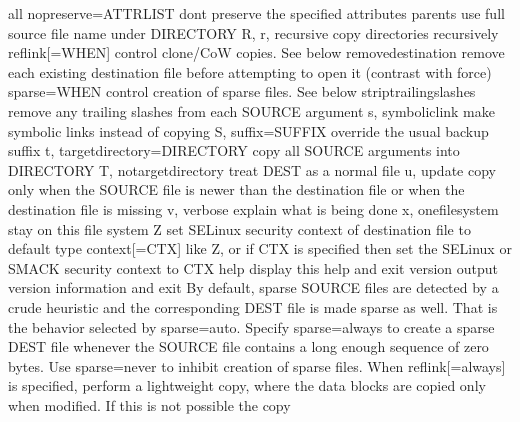\documentclass[letterpaper,12pt,english]{sphinxmanual}
\begin{document}
\begin{sphinxVerbatim}[commandchars=\\\{\}]
                                 all
      \PYGZhy{}\PYGZhy{}no\PYGZhy{}preserve=ATTR\PYGZus{}LIST  don\PYGZsq{}t preserve the specified attributes
      \PYGZhy{}\PYGZhy{}parents                use full source file name under DIRECTORY
  \PYGZhy{}R, \PYGZhy{}r, \PYGZhy{}\PYGZhy{}recursive          copy directories recursively
      \PYGZhy{}\PYGZhy{}reflink[=WHEN]         control clone/CoW copies. See below
      \PYGZhy{}\PYGZhy{}remove\PYGZhy{}destination     remove each existing destination file before
                                 attempting to open it (contrast with \PYGZhy{}\PYGZhy{}force)
      \PYGZhy{}\PYGZhy{}sparse=WHEN            control creation of sparse files. See below
      \PYGZhy{}\PYGZhy{}strip\PYGZhy{}trailing\PYGZhy{}slashes  remove any trailing slashes from each SOURCE
                                 argument
  \PYGZhy{}s, \PYGZhy{}\PYGZhy{}symbolic\PYGZhy{}link          make symbolic links instead of copying
  \PYGZhy{}S, \PYGZhy{}\PYGZhy{}suffix=SUFFIX          override the usual backup suffix
  \PYGZhy{}t, \PYGZhy{}\PYGZhy{}target\PYGZhy{}directory=DIRECTORY  copy all SOURCE arguments into DIRECTORY
  \PYGZhy{}T, \PYGZhy{}\PYGZhy{}no\PYGZhy{}target\PYGZhy{}directory    treat DEST as a normal file
  \PYGZhy{}u, \PYGZhy{}\PYGZhy{}update                 copy only when the SOURCE file is newer
                                 than the destination file or when the
                                 destination file is missing
  \PYGZhy{}v, \PYGZhy{}\PYGZhy{}verbose                explain what is being done
  \PYGZhy{}x, \PYGZhy{}\PYGZhy{}one\PYGZhy{}file\PYGZhy{}system        stay on this file system
  \PYGZhy{}Z                           set SELinux security context of destination
                                 file to default type
      \PYGZhy{}\PYGZhy{}context[=CTX]          like \PYGZhy{}Z, or if CTX is specified then set the
                                 SELinux or SMACK security context to CTX
      \PYGZhy{}\PYGZhy{}help     display this help and exit
      \PYGZhy{}\PYGZhy{}version  output version information and exit
By default, sparse SOURCE files are detected by a crude heuristic and the
corresponding DEST file is made sparse as well.  That is the behavior
selected by \PYGZhy{}\PYGZhy{}sparse=auto.  Specify \PYGZhy{}\PYGZhy{}sparse=always to create a sparse DEST
file whenever the SOURCE file contains a long enough sequence of zero bytes.
Use \PYGZhy{}\PYGZhy{}sparse=never to inhibit creation of sparse files.
When \PYGZhy{}\PYGZhy{}reflink[=always] is specified, perform a lightweight copy, where the
data blocks are copied only when modified.  If this is not possible the copy

\end{sphinxVerbatim}
\end{document}
